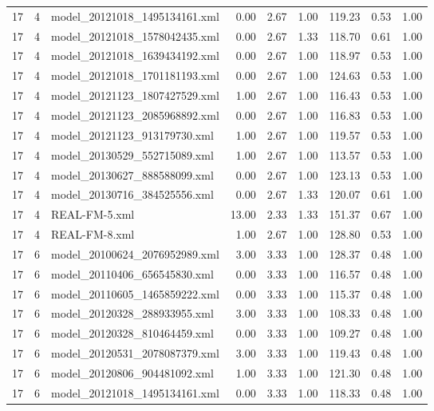 \begin{table}[ht]
\begin{tabular}{rrlrrrrrr}
   17 &   4 & model\_20121018\_1495134161.xml & 0.00 & 2.67 & 1.00 & 119.23 & 0.53 & 1.00 \\ 
   17 &   4 & model\_20121018\_1578042435.xml & 0.00 & 2.67 & 1.33 & 118.70 & 0.61 & 1.00 \\ 
   17 &   4 & model\_20121018\_1639434192.xml & 0.00 & 2.67 & 1.00 & 118.97 & 0.53 & 1.00 \\ 
   17 &   4 & model\_20121018\_1701181193.xml & 0.00 & 2.67 & 1.00 & 124.63 & 0.53 & 1.00 \\ 
   17 &   4 & model\_20121123\_1807427529.xml & 1.00 & 2.67 & 1.00 & 116.43 & 0.53 & 1.00 \\ 
   17 &   4 & model\_20121123\_2085968892.xml & 0.00 & 2.67 & 1.00 & 116.83 & 0.53 & 1.00 \\ 
   17 &   4 & model\_20121123\_913179730.xml & 1.00 & 2.67 & 1.00 & 119.57 & 0.53 & 1.00 \\ 
   17 &   4 & model\_20130529\_552715089.xml & 1.00 & 2.67 & 1.00 & 113.57 & 0.53 & 1.00 \\ 
   17 &   4 & model\_20130627\_888588099.xml & 0.00 & 2.67 & 1.00 & 123.13 & 0.53 & 1.00 \\ 
   17 &   4 & model\_20130716\_384525556.xml & 0.00 & 2.67 & 1.33 & 120.07 & 0.61 & 1.00 \\ 
   17 &   4 & REAL-FM-5.xml & 13.00 & 2.33 & 1.33 & 151.37 & 0.67 & 1.00 \\ 
   17 &   4 & REAL-FM-8.xml & 1.00 & 2.67 & 1.00 & 128.80 & 0.53 & 1.00 \\ 
   17 &   6 & model\_20100624\_2076952989.xml & 3.00 & 3.33 & 1.00 & 128.37 & 0.48 & 1.00 \\ 
   17 &   6 & model\_20110406\_656545830.xml & 0.00 & 3.33 & 1.00 & 116.57 & 0.48 & 1.00 \\ 
   17 &   6 & model\_20110605\_1465859222.xml & 0.00 & 3.33 & 1.00 & 115.37 & 0.48 & 1.00 \\ 
   17 &   6 & model\_20120328\_288933955.xml & 3.00 & 3.33 & 1.00 & 108.33 & 0.48 & 1.00 \\ 
   17 &   6 & model\_20120328\_810464459.xml & 0.00 & 3.33 & 1.00 & 109.27 & 0.48 & 1.00 \\ 
   17 &   6 & model\_20120531\_2078087379.xml & 3.00 & 3.33 & 1.00 & 119.43 & 0.48 & 1.00 \\ 
   17 &   6 & model\_20120806\_904481092.xml & 1.00 & 3.33 & 1.00 & 121.30 & 0.48 & 1.00 \\ 
   17 &   6 & model\_20121018\_1495134161.xml & 0.00 & 3.33 & 1.00 & 118.33 & 0.48 & 1.00 \\ 

\end{tabular}
\end{table}
